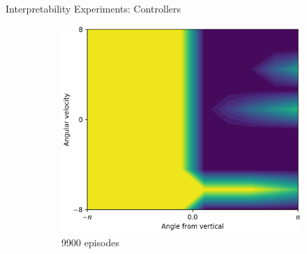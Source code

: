 \documentclass{beamer}
\begin{document}
\begin{frame}{Interpretability Experiments: Controllers}
\begin{figure}[t]
\begin{subfigure}{0.30\linewidth}
      \centering
      \includegraphics[width=0.9\linewidth,trim=0 0 0 0,clip]{assets/ref_plots/controller_refcolexps_r10c2_1_ep9900}
      \caption{9900 episodes}
    \end{subfigure}
    \begin{subfigure}{0.05\linewidth}
      \vspace{-2em}
      \centering

\end{subfigure}
\end{figure}
\end{frame}
\end{document}
